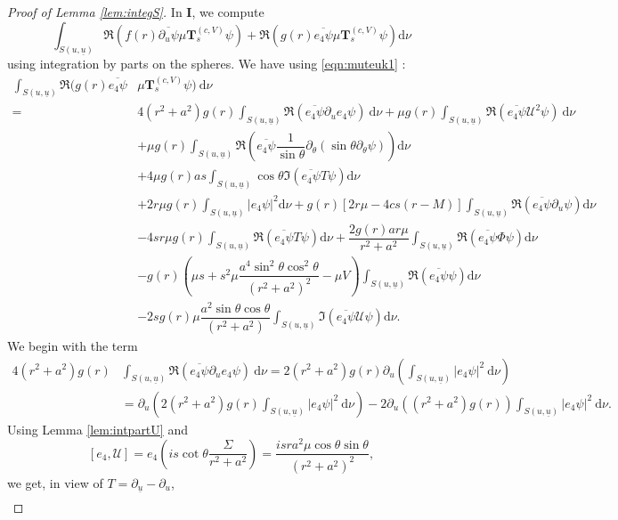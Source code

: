 \documentclass[reqno]{amsart}
\numberwithin{equation}{section}
\newcommand{\Real}{\mathfrak{R}}
\newcommand{\ubar}{{\underline{u}}}
\newcommand{\dee}{\mathrm{d}}
\newcommand{\teuk}{\mathbf{T}}
\newcommand{\un}{\mathbf{I}}
\theoremstyle{plain}
\theoremstyle{definition}
\theoremstyle{remark}
\numberwithin{equation}{section}
\begin{document}
\begin{proof}[Proof of Lemma \ref{lem:integS}]
In $\un$, we compute 
$$\int_{{S(u,\ubar)}}\Real(f(r)\overline{\partial_u\psi}\mu\teuk_s^{(c,V)}{\psi})+\Real(g(r)\overline{e_4\psi}\mu\teuk_s^{(c,V)}\psi)\dee\nu$$
using integration by parts on the spheres. We have using \eqref{eqn:muteuk1} :
\begin{align*}
    \int_{{S(u,\ubar)}}\Real(g(r)\overline{e_4\psi}&\mu\teuk_s^{(c,V)}\psi)\:\dee\nu\\
    =&4(r^2+a^2)g(r)\int_{{S(u,\ubar)}}\mathfrak{R}(\overline{e_4\psi}\partial_u e_4\psi)\:\dee\nu+\mu g(r)\int_{{S(u,\ubar)}}\mathfrak{R}(\overline{e_4\psi} \mathcal{U}^2\psi)\:\dee\nu\\
    &+\mu g(r)\int_{{S(u,\ubar)}}\mathfrak{R}\left(\overline{e_4\psi}\dfrac{1}{\sin\theta}\partial_\theta(\sin\theta\partial_\theta\psi)\right)\dee\nu\\
    &+4\mu g(r) as \int_{{S(u,\ubar)}}\cos\theta\mathfrak{I}(\overline{e_4\psi} T\psi)\dee\nu\\
    &+2r\mu g(r)\int_{{S(u,\ubar)}}|e_4\psi|^2\dee\nu+ g(r) [2r\mu -4cs(r-M)]\int_{{S(u,\ubar)}}\mathfrak{R}(\overline{e_4\psi}\partial_u\psi)\dee\nu\\
    &-4sr\mu g(r)\int_{{S(u,\ubar)}}\mathfrak{R}(\overline{e_4\psi}T\psi)\dee\nu+\dfrac{2g(r)ar\mu }{r^2+a^2}\int_{{S(u,\ubar)}}\mathfrak{R}(\overline{e_4\psi}\Phi\psi)\dee\nu\\
    &-g(r)\left(\mu s+s^2\mu\dfrac{a^4\sin^2\theta\cos^2\theta}{(r^2+a^2)^2}-\mu V\right)\int_{{S(u,\ubar)}}\mathfrak{R}(\overline{e_4\psi}\psi)\dee\nu\\
    &-2sg(r)\mu\dfrac{a^2\sin\theta\cos\theta}{(r^2+a^2)}\int_{{S(u,\ubar)}}\mathfrak{I}(\overline{e_4\psi}\mathcal{U}\psi)\dee\nu.
\end{align*}
We begin with the term 
\begin{align*}
    4(r^2+a^2)g(r)&\int_{{S(u,\ubar)}}\mathfrak{R}(\overline{e_4\psi}\partial_u e_4\psi)\:\dee\nu=2(r^2+a^2)g(r)\partial_u\left(\int_{{S(u,\ubar)}} |e_4\psi|^2\:\dee\nu\right)\\
    &=\partial_u\left(2(r^2+a^2)g(r)\int_{{S(u,\ubar)}} |e_4\psi|^2\:\dee\nu\right)-2\partial_u((r^2+a^2)g(r))\int_{{S(u,\ubar)}} |e_4\psi|^2\:\dee\nu.
\end{align*}
Using Lemma \ref{lem:intpartU} and
$$[e_4,\mathcal{U}]=e_4\left(is\cot\theta\frac{\Sigma}{r^2+a^2}\right)=\frac{isra^2\mu\cos\theta\sin\theta}{(r^2+a^2)^2},$$
we get, in view of $T=\partial_\ubar-\partial_u$,
\begin{align*}

\end{align*}
\end{proof}
\end{document}
